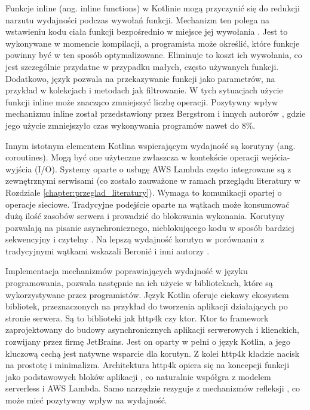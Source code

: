 Funkcje inline (ang. inline functions) w Kotlinie mogą przyczynić się do redukcji narzutu wydajności podczas wywołań funkcji.
Mechanizm ten polega na wstawieniu kodu ciała funkcji bezpośrednio w miejsce jej wywołania \cite{kotlinlangKotlinDocs}.
Jest to wykonywane w momencie kompilacji, a programista może określić, które funkcje powinny być w ten sposób optymalizowane.
Eliminuje to koszt ich wywołania, co jest szczególnie przydatne w przypadku małych, często używanych funkcji.
Dodatkowo, język pozwala na przekazywanie funkcji jako parametrów, na przykład w kolekcjach i metodach jak filtrowanie.
W tych sytuacjach użycie funkcji inline może znacząco zmniejszyć liczbę operacji.
Pozytywny wpływ mechanizmu inline został przedstawiony przez Bergstrom i innych autorów \cite{DBLP:journals/corr/BergstromFRS13}, gdzie jego użycie zmniejszyło czas wykonywania programów nawet do 8\%.

Innym istotnym elementem Kotlina wspierającym wydajność są korutyny (ang. coroutines).
Mogą być one użyteczne zwłaszcza w kontekście operacji wejścia-wyjścia (I/O).
Systemy oparte o usługę AWS Lambda często integrowane są z zewnętrznymi serwisami (co zostało zauważone w ramach przeglądu literatury w Rozdziale \ref{chapter:przeglad_literatury}).
Wymaga to komunikacji opartej o operacje sieciowe.
Tradycyjne podejście oparte na wątkach może konsumować dużą ilość zasobów serwera i prowadzić do blokowania wykonania.
Korutyny pozwalają na pisanie asynchronicznego, nieblokującego kodu w sposób bardziej sekwencyjny i czytelny \cite{kotlinlangKotlinDocs}.
Na lepszą wydajność korutyn w porównaniu z tradycyjnymi wątkami wskazali Beronić i inni autorzy \cite{9803765}.

Implementacja mechanizmów poprawiających wydajność w języku programowania, pozwala następnie na ich użycie w bibliotekach, które są wykorzystywane przez programistów.
Język Kotlin oferuje ciekawy ekosystem bibliotek, przeznaczonych na przykład do tworzenia aplikacji działających po stronie serwera.
Są to biblioteki jak http4k czy ktor.
Ktor to framework zaprojektowany do budowy asynchronicznych aplikacji serwerowych i klienckich, rozwijany przez firmę JetBrains.
Jest on oparty w pełni o język Kotlin, a jego kluczową cechą jest natywne wsparcie dla korutyn.
Z kolei http4k kładzie nacisk na prostotę i minimalizm.
Architektura http4k opiera się na koncepcji funkcji jako podstawowych bloków aplikacji \cite{http4kCoreDocs}, co naturalnie współgra z modelem serverless i AWS Lambda.
Samo narzędzie rezyguje z mechanizmów refleksji \cite{http4kCoreDocs}, co może mieć pozytywny wpływ na wydajność.

